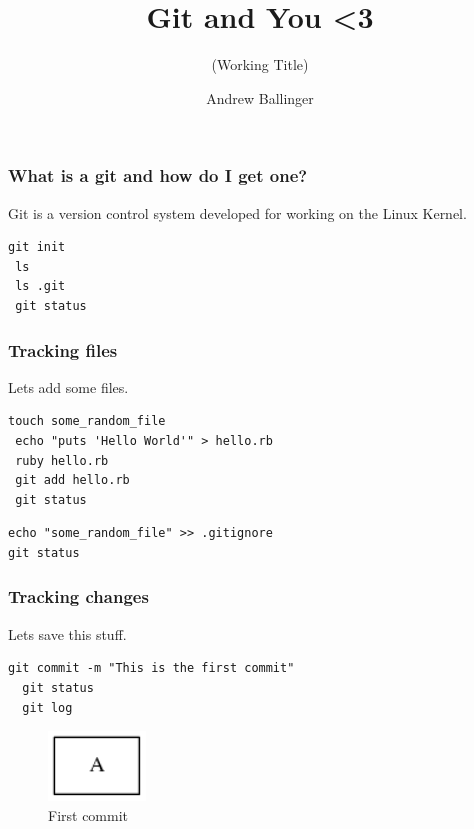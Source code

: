 \documentclass{beamer}
\title{ Git and You <3 }
\subtitle{(Working Title)}
\author{Andrew Ballinger}
\begin{document}
\frame{\titlepage}

\begin{frame}[fragile]
\frametitle{What is a git and how do I get one?}
Git is a version control system developed for working on the Linux Kernel.

\vspace{1em}

\begin{lstlisting}[frame=single]
 git init
 ls
 ls .git
 git status
\end{lstlisting}

\end{frame}

\begin{frame}[fragile]
\frametitle{Tracking files}

Lets add some files.

\vspace{1em}

\begin{lstlisting}[frame=single]
 touch some_random_file
 echo "puts 'Hello World'" > hello.rb
 ruby hello.rb
 git add hello.rb
 git status
\end{lstlisting}

\vspace{1em}

\begin{lstlisting}[frame=single]
echo "some_random_file" >> .gitignore
git status
\end{lstlisting}

\end{frame}

\begin{frame}[fragile]
\frametitle{Tracking changes}

Lets save this stuff.

\vspace{1em}

\begin{lstlisting}[frame=single]
  git commit -m "This is the first commit"
  git status
  git log
\end{lstlisting}

\begin{figure}[p]
  \centering
  \includegraphics[height=5em]{first_commit.png}
  \caption{First commit}
\end{figure}

\end{frame}
\end{document}
